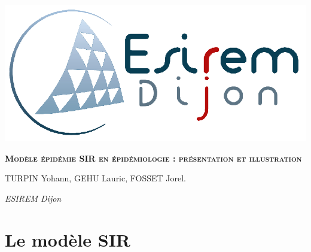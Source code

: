 \documentclass[11pt]{report}
\newcommand\blankpage{%
    \null
    \thispagestyle{empty}%
    \addtocounter{page}{-1}%
    \newpage}
\newcommand{\titulo}{\color{blue}Modèle épidémie SIR en épidémiologie : présentation et illustration}
\newcommand{\autor}{TURPIN Yohann, GEHU Lauric, FOSSET Jorel.}
\newcommand{\fecha}{ESIREM Dijon}
\begin{document}
    \cfoot{\thepage}
    
    \begin{titlepage}
        \reversemarginpar{}
        
        {\centering
            \vspace{3cm} %
            \hspace{5cm} \includegraphics[width=.4\textwidth]{figs/Logo_Esirem.png} %
            \par\vspace{5cm}
            {\scshape\huge\textbf{\hspace{2cm}\titulo}} \par\vspace{6cm}
            
            {\LARGE
            \begin{flushright}
                    \item \autor 
                    \item \textit{\fecha}
            \end{flushright}
            }
        }
    \end{titlepage}

    \afterpage{\blankpage}
    
\begingroup
    \tableofcontents
\endgroup    
    \newpage
    \chapter{Le modèle SIR}
\end{document}
